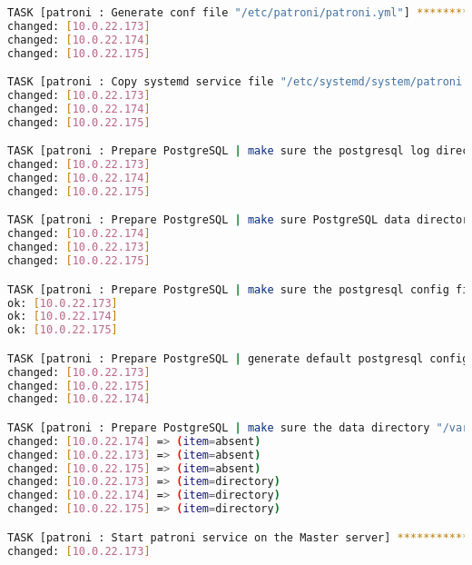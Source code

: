 \begin{flushleft}
\begin{lstlisting}[language=bash, caption=Deploy - Anhang - Deployt,captionpos=b,label={lst:deploy-appendix-deployt},breaklines=true]
TASK [patroni : Generate conf file "/etc/patroni/patroni.yml"] ****************************************************************************************************************************************************
changed: [10.0.22.173]
changed: [10.0.22.174]
changed: [10.0.22.175]

TASK [patroni : Copy systemd service file "/etc/systemd/system/patroni.service"] **********************************************************************************************************************************
changed: [10.0.22.173]
changed: [10.0.22.174]
changed: [10.0.22.175]

TASK [patroni : Prepare PostgreSQL | make sure the postgresql log directory "/var/log/postgresql" exists] *********************************************************************************************************
changed: [10.0.22.173]
changed: [10.0.22.174]
changed: [10.0.22.175]

TASK [patroni : Prepare PostgreSQL | make sure PostgreSQL data directory "/var/lib/postgresql/16/main" exists] ****************************************************************************************************
changed: [10.0.22.174]
changed: [10.0.22.173]
changed: [10.0.22.175]

TASK [patroni : Prepare PostgreSQL | make sure the postgresql config files exists] ********************************************************************************************************************************
ok: [10.0.22.173]
ok: [10.0.22.174]
ok: [10.0.22.175]

TASK [patroni : Prepare PostgreSQL | generate default postgresql config files] ************************************************************************************************************************************
changed: [10.0.22.173]
changed: [10.0.22.175]
changed: [10.0.22.174]

TASK [patroni : Prepare PostgreSQL | make sure the data directory "/var/lib/postgresql/16/main" is empty] *********************************************************************************************************
changed: [10.0.22.174] => (item=absent)
changed: [10.0.22.173] => (item=absent)
changed: [10.0.22.175] => (item=absent)
changed: [10.0.22.173] => (item=directory)
changed: [10.0.22.174] => (item=directory)
changed: [10.0.22.175] => (item=directory)

TASK [patroni : Start patroni service on the Master server] *******************************************************************************************************************************************************
changed: [10.0.22.173]


\end{lstlisting}
\end{flushleft}
